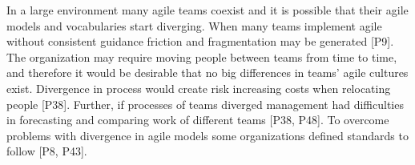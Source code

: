 \documentclass[preprint,authoryear,12pt]{elsarticle}
\begin{document}
% 
% 
% 
% 








In a large environment many agile teams coexist and it is possible that their
agile models and vocabularies start diverging. When many teams implement agile
without consistent guidance friction and fragmentation may be generated [P9].
The organization may require moving people between teams from time to time, and
therefore it would be desirable that no big differences in teams' agile cultures
exist. Divergence in process would create risk increasing costs when relocating
people [P38]. Further, if processes of teams diverged management had
difficulties in forecasting and comparing work of different teams [P38, P48].
To overcome problems with divergence in agile models some organizations defined
standards to follow [P8, P43].
\end{document}
